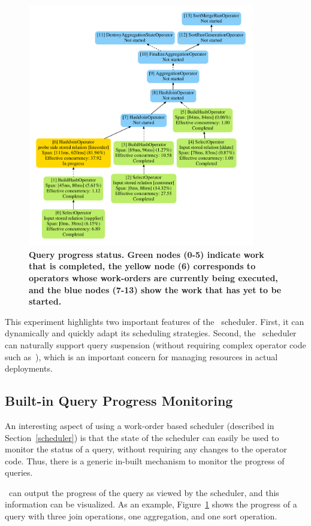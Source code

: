\begin{figure}
	\centering
	\includegraphics[width=0.6\columnwidth,height=4.2in]{system/figures/q31-progress.pdf}
	\caption{\small \textbf{Query progress status. Green nodes (0-5) indicate work that is completed, the yellow node (6) corresponds to operators whose work-orders are currently being executed, and the blue nodes (7-13) show the work that has yet to be started.}}
	\label{fig-query-progress}
\end{figure}

This experiment highlights two important features of the \Quickstep\ scheduler.
First, it can dynamically and quickly adapt its scheduling strategies. %
Second, the \Quickstep\ scheduler can naturally support query suspension (without requiring complex operator code such as~\cite{DavisonG94}), which is an important concern for managing resources in actual deployments.

\subsection{Built-in Query Progress Monitoring}\label{sec:progress-monitoring}
An interesting aspect of using a work-order based scheduler (described in Section~\ref{scheduler}) is that the state of the scheduler can easily be used to monitor the status of a query, without requiring any changes to the operator code. Thus, there is a generic in-built mechanism to monitor the progress of queries.

\Quickstep\ can output the progress of the query as viewed by the scheduler, and this information can be visualized. As an example, Figure~\ref{fig-query-progress} shows the progress of a query with three join operations, one aggregation, and one sort operation.

